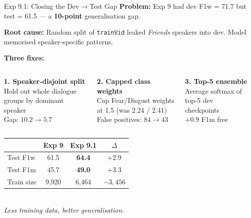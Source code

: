 \documentclass[aspectratio=169,10pt]{beamer}
\begin{document}
\begin{frame}{Exp 9.1: Closing the Dev$\to$Test Gap}
  \small
  \textbf{Problem:} Exp 9 had dev F1w = 71.7 but test = 61.5 --- a \textbf{10-point} generalisation gap.
  \vspace{0.3em}

  \textbf{Root cause:} Random split of \texttt{trainVid} leaked \emph{Friends} speakers into dev. Model memorised speaker-specific patterns.
  \vspace{0.5em}

  \textbf{Three fixes:}
  \begin{columns}[t]
    \centering
    \textbf{1. Speaker-disjoint split}\\[0.3em]
    \footnotesize Hold out whole dialogue groups by dominant speaker
    \vspace{0.3em}\\
    \tiny Gap: $10.2 \to 5.7$

    \centering
    \textbf{2. Capped class weights}\\[0.3em]
    \footnotesize Cap Fear/Disgust weights at 1.5 (was 2.24 / 2.41)
    \vspace{0.3em}\\
    \tiny False positives: $84 \to 43$

    \centering
    \textbf{3. Top-5 ensemble}\\[0.3em]
    \footnotesize Average softmax of top-5 dev checkpoints
    \vspace{0.3em}\\
    \tiny $+0.9$ F1m free
  \end{columns}
  \vfill
  \centering
  \begin{tabular}{lccc}
    \toprule
    & \textbf{Exp 9} & \textbf{Exp 9.1} & \textbf{$\Delta$} \\
    \midrule
    Test F1w   & 61.5 & \textbf{64.4} & +2.9 \\
    Test F1m   & 45.7 & \textbf{49.0} & +3.3 \\
    Train size & 9{,}920 & 6{,}464 & $-3{,}456$ \\
    \bottomrule
  \end{tabular}
  \vspace{0.3em}\\
  \footnotesize \emph{Less training data, better generalisation.}
\end{frame}

\end{document}
